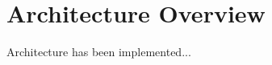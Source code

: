 \section{Architecture Overview}
\label{section:architecture_overview}

Architecture has been implemented...